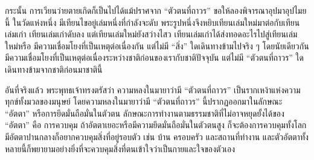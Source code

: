 \documentclass[12pt, openany]{book}
\begin{document}
กระนั้น การ{\wbr}เวียน{\wbr}ว่าย{\wbr}ตาย{\wbr}เกิด{\wbr}ก็{\wbr}เป็น{\wbr}ไป{\wbr}ได้{\wbr}แม้{\wbr}ปราศจาก “ตัวตน{\wbr}ที่{\wbr}ถาวร”  ขอ{\wbr}ให้{\wbr}ลอง{\wbr}พิจารณา{\wbr}อุปมา{\wbr}อุปไมย{\wbr}นี้ ใน{\wbr}วัด{\wbr}แห่ง{\wbr}หนึ่ง มี{\wbr}เทียน{\wbr}ไข{\wbr}อยู่{\wbr}เล่ม{\wbr}หนึ่ง{\wbr}ที่{\wbr}กำลัง{\wbr}จะ{\wbr}ดับ พระ{\wbr}รูป{\wbr}หนึ่ง{\wbr}จึง{\wbr}หยิบ{\wbr}เทียน{\wbr}เล่ม{\wbr}ใหม่{\wbr}มา{\wbr}ต่อ{\wbr}กับ{\wbr}เทียน{\wbr}เล่ม{\wbr}เก่า  เทียน{\wbr}เล่ม{\wbr}เก่า{\wbr}ดับ{\wbr}ลง แต่{\wbr}เทียน{\wbr}เล่ม{\wbr}ใหม่{\wbr}ยัง{\wbr}สว่าง{\wbr}ไสว  เทียน{\wbr}เล่ม{\wbr}เก่า{\wbr}ได้{\wbr}ส่ง{\wbr}ทอด{\wbr}อะไร{\wbr}ไป{\wbr}สู่{\wbr}เทียน{\wbr}เล่ม{\wbr}ใหม่{\wbr}หรือ  มี{\wbr}ความ{\wbr}เชื่อม{\wbr}โยง{\wbr}ที่{\wbr}เป็น{\wbr}เหตุ{\wbr}ต่อ{\wbr}เนื่อง{\wbr}กัน แต่{\wbr}ไม่{\wbr}มี “สิ่ง” ใด{\wbr}เดินทาง{\wbr}ข้าม{\wbr}ไป{\wbr}จริง ๆ  โดย{\wbr}นัย{\wbr}เดียวกัน มี{\wbr}ความ{\wbr}เชื่อม{\wbr}โยง{\wbr}ที่{\wbr}เป็น{\wbr}เหตุ{\wbr}ต่อ{\wbr}เนื่อง{\wbr}ระหว่าง{\wbr}ชาติ{\wbr}ก่อน{\wbr}ของ{\wbr}เรา{\wbr}กับ{\wbr}ชาติ{\wbr}ปัจจุบัน แต่{\wbr}ไม่{\wbr}มี “ตัวตน{\wbr}ที่{\wbr}ถาวร” ใด{\wbr}เดินทาง{\wbr}ข้าม{\wbr}จาก{\wbr}ชาติ{\wbr}ก่อน{\wbr}มา{\wbr}ชาติ{\wbr}นี้{\wbr}

อัน{\wbr}ที่{\wbr}จริง{\wbr}แล้ว พระพุทธเจ้า{\wbr}ทรง{\wbr}ตรัส{\wbr}ว่า ความ{\wbr}หลง{\wbr}ใน{\wbr}มายา{\wbr}ว่า{\wbr}มี “ตัวตน{\wbr}ที่{\wbr}ถาวร” เป็น{\wbr}รากเหง้า{\wbr}แห่ง{\wbr}ความ{\wbr}ทุกข์{\wbr}ทั้งมวล{\wbr}ของ{\wbr}มนุษย์ โดย{\wbr}ความ{\wbr}หลง{\wbr}ใน{\wbr}มายา{\wbr}ว่า{\wbr}มี “ตัวตน{\wbr}ที่{\wbr}ถาวร” นี้{\wbr}ปรากฏ{\wbr}ออก{\wbr}มา{\wbr}ใน{\wbr}ลักษณะ “อัตตา” หรือ{\wbr}การ{\wbr}ยึดมั่น{\wbr}ถือ{\wbr}มั่น{\wbr}ใน{\wbr}ตัวตน  ลักษณะ{\wbr}การ{\wbr}ทำงาน{\wbr}ตาม{\wbr}ธรรมชาติ{\wbr}ที่{\wbr}ไม่{\wbr}อาจ{\wbr}หยุด{\wbr}ยั้ง{\wbr}ได้{\wbr}ของ “อัตตา” คือ การ{\wbr}ควบคุม  ถ้า{\wbr}อัตตา{\wbr}เยอะ{\wbr}หรือ{\wbr}มี{\wbr}ความ{\wbr}ยึดมั่น{\wbr}ถือ{\wbr}มั่น{\wbr}ใน{\wbr}ตัวตน{\wbr}สูง ก็{\wbr}จะ{\wbr}ต้องการ{\wbr}ควบคุม{\wbr}ทั้ง{\wbr}โลก  มี{\wbr}อัตตา{\wbr}ปานกลาง{\wbr}ก็{\wbr}อยาก{\wbr}ควบคุม{\wbr}สิ่ง{\wbr}ที่{\wbr}อยู่{\wbr}รอบ{\wbr}ตัว เช่น บ้าน ครอบครัว และ{\wbr}สถานที่{\wbr}ทำงาน  และ{\wbr}ตัว{\wbr}อัตตา{\wbr}ทั้งหลาย{\wbr}นี้{\wbr}ก็{\wbr}พยายาม{\wbr}อย่าง{\wbr}ยิ่ง{\wbr}ที่{\wbr}จะ{\wbr}ควบคุม{\wbr}สิ่ง{\wbr}ที่{\wbr}ตน{\wbr}เข้าใจ{\wbr}ว่า{\wbr}เป็น{\wbr}กาย{\wbr}และ{\wbr}ใจ{\wbr}ของ{\wbr}ตัวเอง{\wbr}
\end{document}
